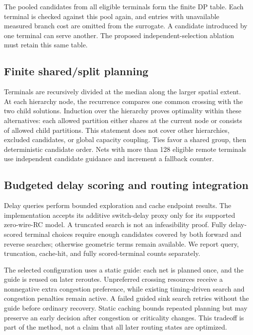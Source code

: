 \documentclass[conference,10pt]{IEEEtran}
\begin{document}
The pooled candidates from all eligible terminals form the finite DP table. Each terminal is checked against this pool again, and entries with unavailable measured branch cost are omitted from the surrogate. A candidate introduced by one terminal can serve another. The proposed independent-selection ablation must retain this same table.

\subsection{Finite shared/split planning}
Terminals are recursively divided at the median along the larger spatial extent. At each hierarchy node, the recurrence compares one common crossing with the two child solutions. Induction over the hierarchy proves optimality within these alternatives: each allowed partition either shares at the current node or consists of allowed child partitions. This statement does not cover other hierarchies, excluded candidates, or global capacity coupling. Ties favor a shared group, then deterministic candidate order. Nets with more than 128 eligible remote terminals use independent candidate guidance and increment a fallback counter.

\subsection{Budgeted delay scoring and routing integration}
Delay queries perform bounded exploration and cache endpoint results. The implementation accepts its additive switch-delay proxy only for its supported zero-wire-RC model. A truncated search is not an infeasibility proof. Fully delay-scored terminal choices require enough candidates covered by both forward and reverse searches; otherwise geometric terms remain available. We report query, truncation, cache-hit, and fully scored-terminal counts separately.

The selected configuration uses a static guide: each net is planned once, and the guide is reused on later reroutes. Unpreferred crossing resources receive a nonnegative extra congestion preference, while existing timing-driven search and congestion penalties remain active. A failed guided sink search retries without the guide before ordinary recovery. Static caching bounds repeated planning but may preserve an early decision after congestion or criticality changes. This tradeoff is part of the method, not a claim that all later routing states are optimized.
\end{document}
